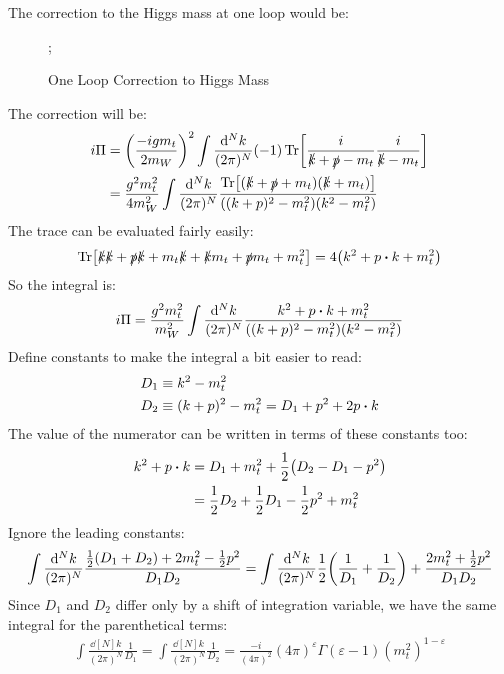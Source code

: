 \documentclass[12pt]{article}
\newcommand{\sla}[1]{\slashed{#1}}
\renewcommand{\sp}{\slashed{p}}
\newcommand{\veps}{\varepsilon}
\begin{document}
The correction to the Higgs mass at one loop would be:
\begin{figure}[H]
  \centering
  ;  
  \caption{One Loop Correction to Higgs Mass}
  \label{fig:3}
\end{figure}
The correction will be:
\begin{align*}
  i\Pi&=\qty(\frac{-igm_t}{2m_W})^2\int\frac{\dd[N]{k}}{(2\pi)^N}(-1)
  \Tr[\frac{i}{\sla{k}+\sp-m_t}\frac{i}{\sla{k}-m_t}]\\
  &=\frac{g^2m_t^2}{4m_W^2}\int\frac{\dd[N]{k}}{(2\pi)^N}
  \frac{\Tr[(\sla{k}+\sp+m_t)(\sla{k}+m_t)]}{((k+p)^2-m_t^2)(k^2-m_t^2)}
\end{align*}
The trace can be evaluated fairly easily:
\begin{align*}
  \Tr[\sla{k}\sla{k}+\sp\sla{k}+m_t\sla{k}+\sla{k}m_t+\sp m_t+m_t^2]=
  4\qty(k^2+p\vdot k+m_t^2)
\end{align*}
So the integral is:
\begin{align*}
  i\Pi=\frac{g^2m_t^2}{m_W^2}\int\frac{\dd[N]{k}}{(2\pi)^N}
  \frac{k^2+p\vdot k+m_t^2}{((k+p)^2-m_t^2)(k^2-m_t^2)}
\end{align*}
Define constants to make the integral a bit easier to read:
\begin{align*}
  D_1&\equiv k^2-m_t^2\\
  D_2&\equiv (k+p)^2-m_t^2=D_1+p^2+2p\vdot k
\end{align*}
The value of the numerator can be written in terms of these constants too:
\begin{align*}
  k^2+p\vdot k&=D_1+m_t^2+\frac12\qty(D_2-D_1-p^2)\\
  &=\frac12D_2+\frac12D_1-\frac12p^2+m_t^2
\end{align*}
Ignore the leading constants:
\begin{align*}
  \int\frac{\dd[N]{k}}{(2\pi)^N}\frac{\frac12(D_1+D_2)+2m_t^2-\frac12p^2}{D_1D_2}
  =\int\frac{\dd[N]{k}}{(2\pi)^N}\frac12\qty(\frac1{D_1}+\frac1{D_2})+
  \frac{2m_t^2+\frac12p^2}{D_1D_2}
\end{align*}
Since $D_1$ and $D_2$ differ only by a shift of integration variable, we have the same integral for the parenthetical terms:
\begin{align*}
  \int\frac{\dd[N]{k}}{(2\pi)^N}\frac1{D_1}=
  \int\frac{\dd[N]{k}}{(2\pi)^N}\frac1{D_2}=
  \frac{-i}{(4\pi)^2}(4\pi)^\veps\Gamma(\veps-1)(m_t^2)^{1-\veps}
\end{align*}
\end{document}
